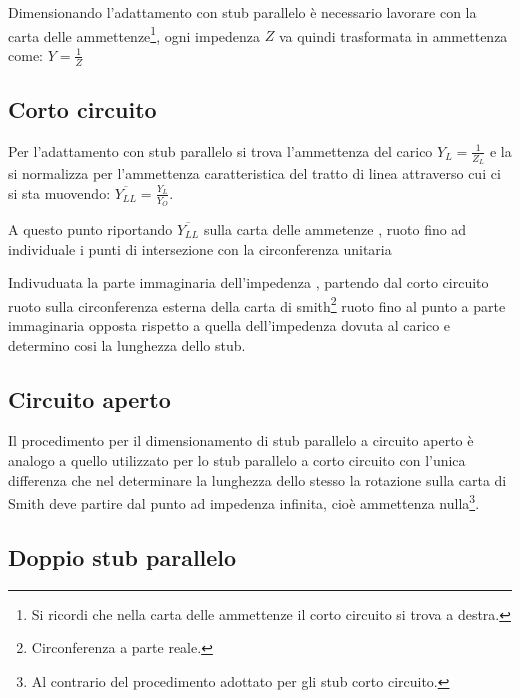 		Dimensionando l'adattamento con stub parallelo è necessario lavorare con la carta delle ammettenze\footnote{Si ricordi che nella carta delle ammettenze il corto circuito si trova a destra.}, ogni impedenza $Z$ va quindi trasformata in ammettenza come: $Y=\frac{1}{Z}$

		\subsection{Corto circuito}
				
			Per l'adattamento con stub parallelo si trova l'ammettenza del carico $Y_L=\frac{1}{Z_L}$ e la si normalizza per l'ammettenza caratteristica del tratto di linea attraverso cui ci si sta muovendo: $\overline{Y_{LL}}=\frac{Y_L}{Y_O}$.


			A questo punto riportando $\overline{Y_{LL}}$ sulla carta delle ammetenze , ruoto fino ad individuale i punti di intersezione con la circonferenza unitaria

			Indivuduata la parte immaginaria dell'impedenza , partendo dal corto circuito ruoto sulla circonferenza esterna della carta di smith\footnote{Circonferenza a parte reale.} ruoto fino al punto a parte immaginaria opposta rispetto a quella dell'impedenza dovuta al carico e determino cosi la lunghezza dello stub.

		\subsection{Circuito aperto}

		Il procedimento per il dimensionamento di stub parallelo a circuito aperto è analogo a quello utilizzato per lo stub parallelo a corto circuito con l'unica differenza che nel determinare la lunghezza dello stesso la rotazione sulla carta di Smith deve partire dal punto ad impedenza infinita, cioè ammettenza nulla\footnote{Al contrario del procedimento adottato per gli stub corto circuito.}.



		\subsection{Doppio stub parallelo}

